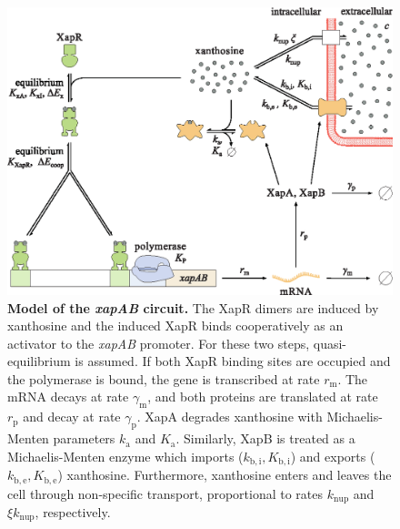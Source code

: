 \documentclass[10pt,letterpaper]{article}
\newcommand{\n}[1]{\mathrm{#1}}
\begin{document}
	\begin{figure}%
		\centering
		\includegraphics{media/Fig2_model.eps}
		\caption{{\bf Model of the \emph{xapAB} circuit.}
			The XapR dimers are induced by xanthosine and the induced XapR binds
			cooperatively as an activator to the \emph{xapAB} promoter. For
			these two steps, quasi-equilibrium is assumed. If both XapR binding
			sites are occupied and the polymerase is bound, the gene is
			transcribed at rate $r_{\n{m}}$. The mRNA decays at rate
			$\gamma_{\n{m}}$, and both proteins are translated at rate
			$r_{\n{p}}$ and decay at rate $\gamma_{\n{p}}$. XapA degrades
			xanthosine with Michaelis-Menten parameters $k_{\n{a}}$ and $K_{\n{a}}$.
			Similarly, XapB is treated as a Michaelis-Menten enzyme which imports ($k_{\n{b,i}}, K_{\n{b,i}}$) and exports ($k_{\n{b,e}}, K_{\n{b,e}}$) xanthosine. Furthermore, xanthosine enters and leaves the cell
			through non-specific transport, proportional to rates $k_{\n{nup}}$ and $\xi
			k_{\n{nup}}$, respectively.}
		\label{fig2:model}
	\end{figure}
	
\end{document}
